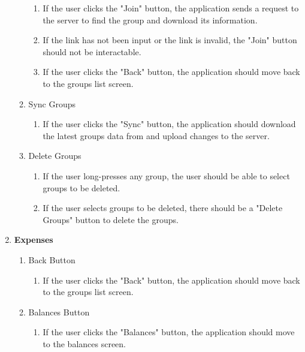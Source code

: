 \documentclass[conference]{IEEEtran}
\begin{document}
\begin{enumerate}
\begin{enumerate}
\begin{enumerate}
                        \item If the user clicks the "Join" button, the application sends a request to the server to find the group and download its information.
                        \item If the link has not been input or the link is invalid, the "Join" button should not be interactable.
                        \item If the user clicks the "Back" button, the application should move back to the groups list screen.
                    \end{enumerate}
                \item Sync Groups
                    \begin{enumerate}
                        \item If the user clicks the "Sync" button, the application should download the latest groups data from and upload changes to the server.
                    \end{enumerate}
                \item Delete Groups
                    \begin{enumerate}
                        \item If the user long-presses any group, the user should be able to select groups to be deleted.
                        \item If the user selects groups to be deleted, there should be a "Delete Groups" button to delete the groups.
                    \end{enumerate}
            \end{enumerate}
        \item \textbf{Expenses}
            \begin{enumerate}
                \item Back Button
                    \begin{enumerate}
                        \item If the user clicks the "Back" button, the application should move back to the groups list screen.
                    \end{enumerate}
                \item Balances Button
                    \begin{enumerate}
                        \item If the user clicks the "Balances" button, the application should move to the balances screen.
                    \end{enumerate}

\end{enumerate}
\end{enumerate}
\end{document}
